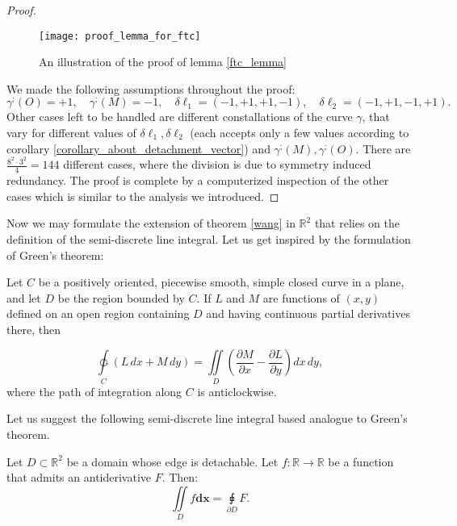 \documentclass[11pt]{book}
\begin{document}
\begin{proof}
\begin{figure}[H]
\texttt{[image: proof\_lemma\_for\_ftc]}
\caption{An illustration of the proof of lemma \ref{ftc_lemma}}
\label{ftc_lemma_figure}
\end{figure}

We made the following assumptions throughout the proof:
\[
\gamma^{;}\left(O\right)=+1,\quad\gamma^{;}\left(M\right)=-1,\quad\delta\ell_{1}=\left(-1,+1,+1,-1\right),\quad\delta\ell_{2}=\left(-1,+1,-1,+1\right).
\]
Other cases left to be handled are different constallations of the
curve $\gamma$, that vary for different values of $\delta\ell_{1},\delta\ell_{2}$
(each accepts only a few values according to corollary \ref{corollary_about_detachment_vector}) and $\gamma^{;}\left(M\right),\gamma^{;}\left(O\right)$.
There are $\frac{8^{2}\cdot3^{2}}{4}=144$ different cases, where
the division is due to symmetry induced redundancy. The proof is complete
by a computerized inspection of the other cases which is similar to
the analysis we introduced.
\end{proof}

Now we may formulate the extension of theorem \ref{wang}
in $\mathbb{R}^{2}$ that relies on the definition of the semi-discrete
line integral. Let us get inspired by the formulation of Green's theorem:
\begin{theorem}Let $C$ be a positively oriented, piecewise smooth, simple closed
curve in a plane, and let $D$ be the region bounded by $C$. If $L$
and $M$ are functions of $\left(x,y\right)$ defined on an open region
containing $D$ and having continuous partial derivatives there, then

\[
\underset{C}{\ointctrclockwise}{\displaystyle \left(L\,dx+M\,dy\right)}{\displaystyle =\underset{D}{\iint}\left(\frac{\partial M}{\partial x}-\frac{\partial L}{\partial y}\right)dx\,dy},
\]
 where the path of integration along $C$ is anticlockwise.
\label{green_theorem}
\end{theorem}

Let us suggest the following semi-discrete line integral based analogue to Green's theorem.
\begin{theorem}Let $D\subset\mathbb{R}^{2}$ be a domain whose edge is detachable.
Let $f:\mathbb{R}\rightarrow\mathbb{R}$ be a function that admits
an antiderivative $F$. Then:
\[
\underset{D}{\iint}f\boldsymbol{dx}=\underset{\partial D}{\sqint}F.
\]
\label{ftc_theorem}
\end{theorem}
\end{document}
